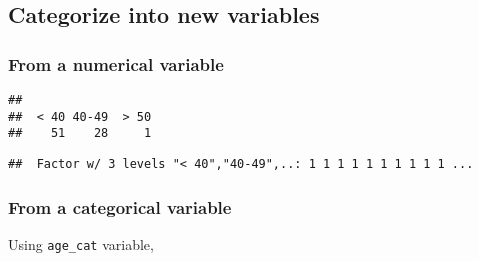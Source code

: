 \documentclass[]{book}
\newenvironment{Shaded}{\begin{snugshade}}{\end{snugshade}}
\newcommand{\KeywordTok}[1]{\textcolor[rgb]{0.13,0.29,0.53}{\textbf{{#1}}}}
\newcommand{\DataTypeTok}[1]{\textcolor[rgb]{0.13,0.29,0.53}{{#1}}}
\newcommand{\DecValTok}[1]{\textcolor[rgb]{0.00,0.00,0.81}{{#1}}}
\newcommand{\StringTok}[1]{\textcolor[rgb]{0.31,0.60,0.02}{{#1}}}
\newcommand{\OtherTok}[1]{\textcolor[rgb]{0.56,0.35,0.01}{{#1}}}
\newcommand{\NormalTok}[1]{{#1}}
\theoremstyle{definition}
\theoremstyle{definition}
\theoremstyle{remark}
\begin{document}
\subsection{Categorize into new
variables}\label{categorize-into-new-variables}

\subsubsection{From a numerical
variable}\label{from-a-numerical-variable}

\begin{Shaded}
\end{Shaded}

\begin{verbatim}
## 
##  < 40 40-49  > 50 
##    51    28     1
\end{verbatim}

\begin{Shaded}
\end{Shaded}

\begin{verbatim}
##  Factor w/ 3 levels "< 40","40-49",..: 1 1 1 1 1 1 1 1 1 1 ...
\end{verbatim}

\subsubsection{From a categorical
variable}\label{from-a-categorical-variable}

Using \texttt{age\_cat} variable,

\begin{Shaded}
\end{Shaded}
\end{document}
